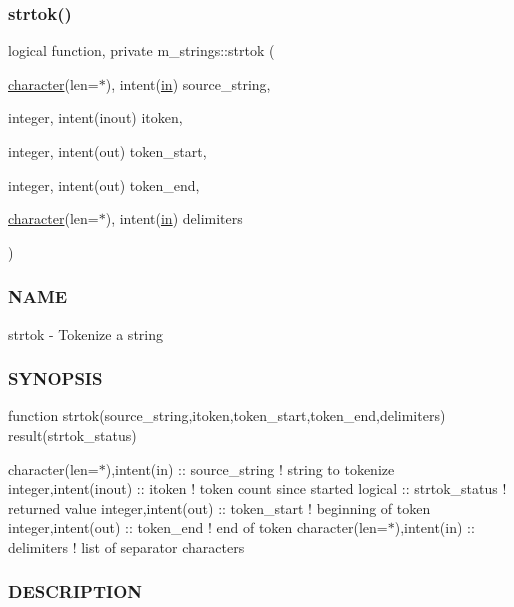 \subsubsection{\texorpdfstring{strtok()}{strtok()}}
{\footnotesize\ttfamily logical function, private m\+\_\+strings\+::strtok (\begin{DoxyParamCaption}\item[{\hyperlink{option__stopwatch_83_8txt_abd4b21fbbd175834027b5224bfe97e66}{character}(len=$\ast$), intent(\hyperlink{M__journal_83_8txt_afce72651d1eed785a2132bee863b2f38}{in})}]{source\+\_\+string,  }\item[{integer, intent(inout)}]{itoken,  }\item[{integer, intent(out)}]{token\+\_\+start,  }\item[{integer, intent(out)}]{token\+\_\+end,  }\item[{\hyperlink{option__stopwatch_83_8txt_abd4b21fbbd175834027b5224bfe97e66}{character}(len=$\ast$), intent(\hyperlink{M__journal_83_8txt_afce72651d1eed785a2132bee863b2f38}{in})}]{delimiters }\end{DoxyParamCaption})\hspace{0.3cm}{\ttfamily [private]}}



\subsubsection*{N\+A\+ME}

strtok -\/ Tokenize a string \subsubsection*{S\+Y\+N\+O\+P\+S\+IS}

function strtok(source\+\_\+string,itoken,token\+\_\+start,token\+\_\+end,delimiters) result(strtok\+\_\+status)

character(len=$\ast$),intent(in) \+:\+: source\+\_\+string ! string to tokenize integer,intent(inout) \+:\+: itoken ! token count since started logical \+:\+: strtok\+\_\+status ! returned value integer,intent(out) \+:\+: token\+\_\+start ! beginning of token integer,intent(out) \+:\+: token\+\_\+end ! end of token character(len=$\ast$),intent(in) \+:\+: delimiters ! list of separator characters

\subsubsection*{D\+E\+S\+C\+R\+I\+P\+T\+I\+ON}

